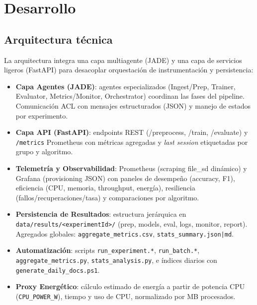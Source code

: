 \documentclass[12pt,twoside]{report}
\begin{document}
\chapter{Desarrollo}
\section{Arquitectura técnica}
La arquitectura integra una capa multiagente (JADE) y una capa de servicios ligeros (FastAPI) para desacoplar orquestación de instrumentación y persistencia:
\begin{itemize}
  \item \textbf{Capa Agentes (JADE)}: agentes especializados (Ingest/Prep, Trainer, Evaluator, Metrics/Monitor, Orchestrator) coordinan las fases del pipeline. Comunicación ACL con mensajes estructurados (JSON) y manejo de estados por experimento.
  \item \textbf{Capa API (FastAPI)}: endpoints REST (/preprocess, /train, /evaluate) y \texttt{/metrics} Prometheus con métricas agregadas y \emph{last session} etiquetadas por grupo y algoritmo.
  \item \textbf{Telemetría y Observabilidad}: Prometheus (scraping file\_sd dinámico) y Grafana (provisioning JSON) con paneles de desempeño (accuracy, F1), eficiencia (CPU, memoria, throughput, energía), resiliencia (fallos/recuperaciones/tasa) y comparaciones por algoritmo.
  \item \textbf{Persistencia de Resultados}: estructura jerárquica en \texttt{data/results/<experimentId>/} (prep, models, eval, logs, monitor, report). Agregados globales: \texttt{aggregate\_metrics.csv}, \texttt{stats\_summary.json|md}.
  \item \textbf{Automatización}: scripts \texttt{run\_experiment.*}, \texttt{run\_batch.*}, \texttt{aggregate\_metrics.py}, \texttt{stats\_analysis.py}, e índices diarios con \texttt{generate\_daily\_docs.ps1}.
  \item \textbf{Proxy Energético}: cálculo estimado de energía a partir de potencia CPU (\texttt{CPU\_POWER\_W}), tiempo y uso de CPU, normalizado por MB procesados.
\end{itemize}
\end{document}
